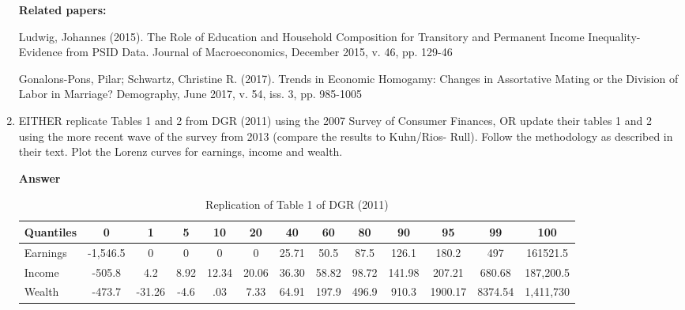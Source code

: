 \documentclass[12pt]{article}%
\begin{document}
\begin{enumerate}
\begin{itemize}
 \end{itemize}

	\textbf{Related papers:}


Ludwig, Johannes (2015). The Role of Education and Household Composition for Transitory and Permanent Income Inequality-Evidence from PSID Data. 
Journal of Macroeconomics, December 2015, v. 46, pp. 129-46

Gonalons-Pons, Pilar; Schwartz, Christine R. (2017). Trends in Economic Homogamy: Changes in Assortative Mating or the Division of Labor in Marriage?
Demography, June 2017, v. 54, iss. 3, pp. 985-1005
	
	
	\item EITHER replicate Tables 1 and 2 from DGR (2011) using the 2007 Survey of Consumer Finances, OR update their tables 1 and 2 using the more
	recent wave of the survey from 2013 (compare the results to Kuhn/Rios-	Rull). Follow the methodology as described in their text. Plot the Lorenz
	curves for earnings, income and wealth.
	
		    	\vspace{3mm}
	
	{\bf Answer}   	
	
	
	
	\begin {table}[H]
	\begin{center}
			\caption {Replication of Table 1 of DGR (2011)}
			\label{tab:Table1}
			{
				\def\sym#1{\ifmmode^{#1}\else\(^{#1}\)\fi}
				\begin{tabular}{l*{12}{c}}
					\hline
					Quantiles&   0&1&5&10&20&40&60&80&90&95&99&100\\
					\hline
					Earnings &-1,546.5 & 0&0 & 0&0&25.71&50.5&87.5& 126.1& 180.2&497&161521.5\\
					Income   &-505.8  & 4.2 & 8.92& 12.34& 20.06&36.30& 58.82&98.72&141.98&207.21&680.68&187,200.5   \\
					Wealth   & -473.7 &-31.26 & -4.6&.03 & 7.33&64.91&197.9&496.9&910.3&1900.17&8374.54&   1,411,730   \\
					\hline
				\end{tabular}
			}	

	\end{center} 
	\end {table}

	
	\vspace{3mm}
	
\end{enumerate}

\strut

\onehalfspacing
\end{document}
